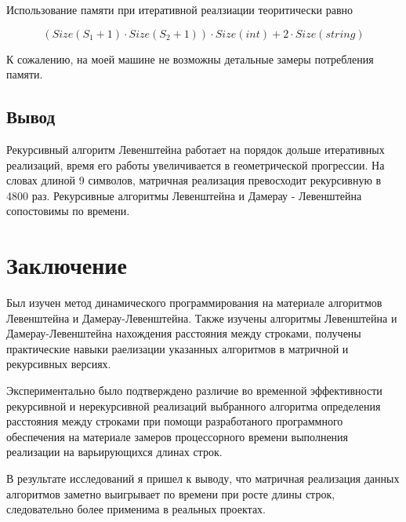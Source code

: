 \documentclass[12pt]{report}
\begin{document}
	\par
	Использование памяти при итеративной реалзиации теоритически равно

	\begin{equation}
		(Size(S_{1} + 1) \cdot Size(S_{2} + 1)) \cdot Size(int) + 2 \cdot Size(string)
	\end{equation}

	\par
	К сожалению, на моей машине не возможны детальные замеры потребления памяти.

	\section{Вывод}

	\par
	Рекурсивный алгоритм Левенштейна работает на порядок дольше итеративных реализаций, время его работы увеличивается в геометрической прогрессии. На словах длиной 9 символов, матричная реализация превосходит рекурсивную в 4800 раз. Рекурсивные алгоритмы Левенштейна и Дамерау - Левенштейна сопостовимы по времени.

	\chapter{Заключение}

	Был изучен метод динамического программирования на материале алгоритмов Левенштейна и Дамерау-Левенштейна.
	Также изучены алгоритмы Левенштейна и Дамерау-Левенштейна нахождения расстояния между строками, получены практические навыки раелизации указанных алгоритмов
	в матричной  и рекурсивных версиях. 

	Экспериментально было подтверждено различие во временной эффективности рекурсивной и нерекурсивной реализаций выбранного алгоритма определения расстояния между строками при помощи разработаного программного обеспечения на материале замеров процессорного времени выполнения реализации на варьирующихся длинах строк. 

	В результате исследований я пришел к выводу, что матричная реализация данных алгоритмов заметно выигрывает по времени при росте длины строк, следовательно более применима в реальных проектах.
\end{document}
